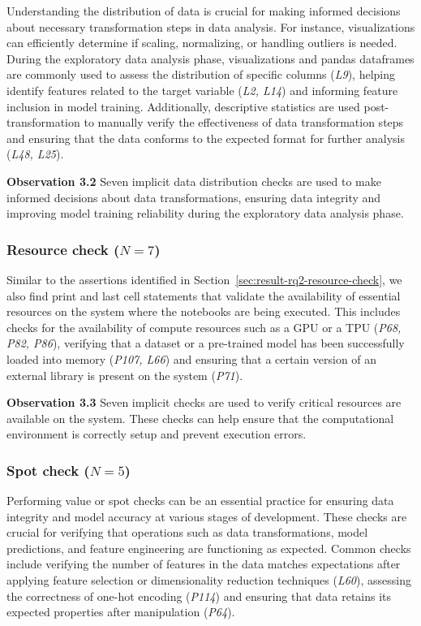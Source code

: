\documentclass[journal]{IEEEtran}       %
\newcommand{\highlight}[1]{
  \begin{framed}%
    \noindent#1
\end{framed}}
\begin{document}
Understanding the distribution of data is crucial for making informed
decisions about necessary transformation steps in data analysis. For
instance, visualizations can efficiently determine if scaling,
normalizing, or handling outliers is needed. During the exploratory
data analysis phase, visualizations and pandas dataframes are
commonly used to assess the distribution of specific columns
(\emph{L9}), helping identify features related to the target variable
(\emph{L2, L14}) and informing feature inclusion in model training.
Additionally, descriptive statistics are used post-transformation to
manually verify the effectiveness of data transformation steps and
ensuring that the data conforms to the expected format for further
analysis (\emph{L48, L25}).

\highlight{\textbf{Observation 3.2} Seven implicit data distribution
  checks are used to make informed decisions about data
  transformations, ensuring data integrity and improving model training
reliability during the exploratory data analysis phase.}

\subsubsection{Resource check ($N = 7$)}\label{sec:implicit-resource-check}

Similar to the assertions identified in
Section~\ref{sec:result-rq2-resource-check}, we also find print and
last cell statements that validate the availability of essential
resources on the system where the notebooks are being executed. This
includes checks for the availability of compute resources such as a
GPU or a TPU (\emph{P68, P82, P86}), verifying that a dataset or a
pre-trained model has been successfully loaded into memory
(\emph{P107, L66}) and ensuring that a certain version of an external
library is present on the system (\emph{P71}).

\highlight{\textbf{Observation 3.3} Seven implicit checks are used to
  verify critical resources are available on the system. These checks
  can help ensure that the computational environment is correctly setup
and prevent execution errors.}

\subsubsection{Spot check ($N = 5$)}

Performing value or spot checks can be an essential practice for
ensuring data integrity and model accuracy at various stages of
development. These checks are crucial for verifying that operations
such as data transformations, model predictions, and feature
engineering are functioning as expected. Common checks include
verifying the number of features in the data matches expectations
after applying feature selection or dimensionality reduction
techniques (\emph{L60}), assessing the correctness of one-hot
encoding (\emph{P114}) and ensuring that data retains its expected
properties after manipulation (\emph{P64}).
\end{document}
